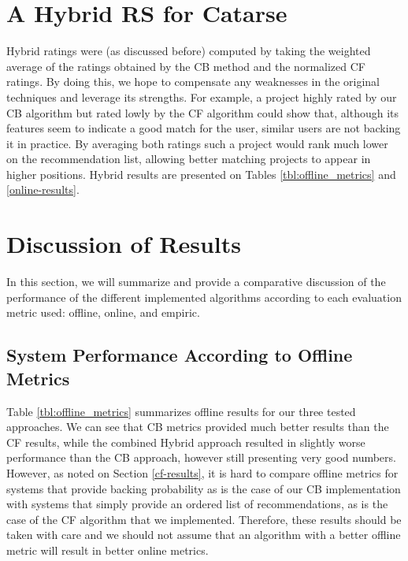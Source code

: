 \documentclass[cic,tc,english]{iiufrgs}
\newcommand{\adriano}[1]{#1}
\begin{document}
\section{A Hybrid RS for Catarse}
Hybrid ratings were (as discussed before) computed by taking the weighted average of the ratings obtained by the CB method and the normalized CF ratings. By doing this, we hope to compensate any weaknesses in the original techniques and leverage its strengths. For example, a project highly rated by our CB algorithm but rated lowly by the CF algorithm could show that, although its features seem to indicate a good match for the user, similar users are not backing it in practice. By averaging both ratings such a project would rank much lower on the recommendation list, allowing better matching projects to appear in higher positions. \adriano{Hybrid results are presented on Tables \ref{tbl:offline_metrics} and \ref{online-results}}.

\section{Discussion of Results}
In this section, we will summarize and provide a comparative discussion of the performance of the different implemented algorithms according to each evaluation metric used: offline, online, and empiric.

\subsection{System Performance According to Offline Metrics}
Table \ref{tbl:offline_metrics} summarizes offline results for our three tested approaches. We can see that CB metrics provided much better results than the CF results, while the combined Hybrid approach resulted in slightly worse performance than the CB approach, however still presenting very good numbers. However, as noted on Section \ref{cf-results}, it is hard to compare offline metrics for systems that provide backing probability as is the case of our CB implementation with systems that simply provide an ordered list of recommendations, as is the case of the CF algorithm that we implemented. Therefore, these results should be taken with care and we should not assume that an algorithm with a better offline metric will result in better online metrics.
\end{document}
